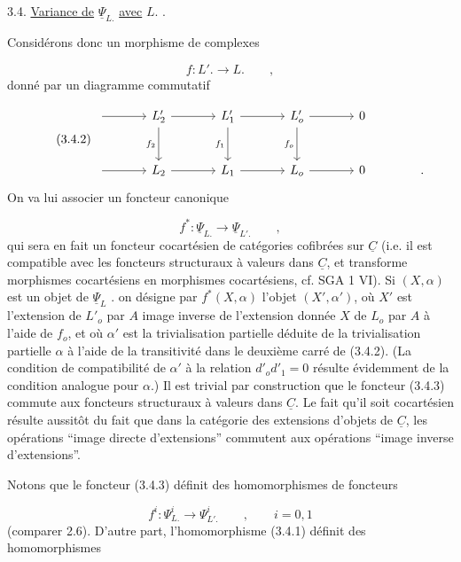 3.4. \underline{Variance de} $\underline{\Psi}_{L.}$ \underline{avec} $L.$ .

Considérons donc un morphisme de complexes

\begin{equation}\tag{3.4.1}
f : L'. \longrightarrow L. \qquad ,
\end{equation}
donné par un diagramme commutatif

\begin{equation}\tag{3.4.2}
\begin{tikzcd}[column sep=large, row sep=large]
{} \arrow[r] & L'_2 \arrow[r] \arrow[d, "f_2"'] & L'_1 \arrow[r] \arrow[d, "f_1"'] & L'_o \arrow[r] \arrow[d, "f_o"'] & 0 \\
{} \arrow[r] & L_2 \arrow[r] & L_1 \arrow[r] & L_o \arrow[r] & 0 & .
\end{tikzcd}
\end{equation}
On va lui associer un foncteur canonique

\begin{equation}\tag{3.4.3}
f^* : \underline{\Psi}_{L.} \longrightarrow \underline{\Psi}_{L'.} \qquad ,
\end{equation}
qui sera en fait un foncteur cocartésien de catégories cofibrées sur $\underline{C}$ (i.e. il est compatible avec les foncteurs structuraux à valeurs dans $\underline{C}$, et transforme morphismes cocartésiens en morphismes cocartésiens, cf. SGA 1 VI). Si $(X,\alpha)$ est un objet de $\underline{\Psi}_L$ . on désigne par $f^*(X,\alpha)$ l'objet
$(X',\alpha')$, où $X'$ est l'extension de $L'_o$ par $A$ image inverse de l'extension donnée $X$ de $L_o$ par $A$ à l'aide de $f_o$, et où $\alpha'$ est la trivialisation partielle déduite de la trivialisation partielle $\alpha$ à l'aide de la transitivité dans le deuxième carré de (3.4.2). (La condition de compatibilité de $\alpha'$ à la relation $d'_o d'_1 = 0$ résulte évidemment de la condition analogue pour $\alpha$.) Il est trivial par construction que le foncteur (3.4.3) commute aux foncteurs structuraux à valeurs dans $\underline{C}$. Le fait qu'il soit cocartésien résulte aussitôt du fait que dans la catégorie des extensions d'objets de $\underline{C}$, les opérations ``image directe d'extensions'' commutent aux opérations ``image inverse d'extensions''.

Notons que le foncteur (3.4.3) définit des homomorphismes de foncteurs

\begin{equation}\tag{3.4.4}
f^i : \Psi^i_{L.} \longrightarrow \Psi^i_{L'.} \qquad , \qquad i=0,1
\end{equation}
(comparer 2.6). D'autre part, l'homomorphisme (3.4.1) définit des homomorphismes


